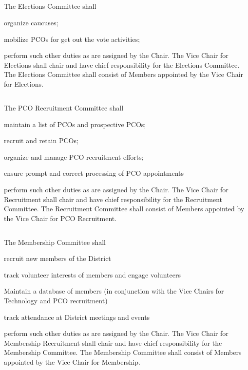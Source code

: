 \subsection{} \label{elections-committee}
The Elections Committee shall
\begin{inlinealphalist}
    \item organize caucuses;
    \item mobilize PCOs for get out the vote activities;
    \item perform such other duties as are assigned by the Chair. The Vice Chair for Elections shall chair and have chief responsibility for the Elections Committee. The Elections Committee shall consist of Members appointed by the Vice Chair for Elections.
\end{inlinealphalist}

\subsection{} \label{pco-recruitment-committee}
The PCO Recruitment Committee shall
\begin{inlinealphalist}
    \item maintain a list of PCOs and prospective PCOs;
    \item recruit and retain PCOs;
    \item organize and manage PCO recruitment efforts;
    \item ensure prompt and correct processing of PCO appointments
    \item perform such other duties as are assigned by the Chair. The Vice Chair for Recruitment shall chair and have chief responsibility for the Recruitment Committee.  The Recruitment Committee shall consist of Members appointed by the Vice Chair for PCO Recruitment.
\end{inlinealphalist}

\subsection{} \label{membership-committee}
The Membership Committee shall
\begin{inlinealphalist}
    \item recruit new members of the District
    \item track volunteer interests of members and engage volunteers
    \item Maintain a database of members (in conjunction with the Vice Chairs for Technology and PCO recruitment)
    \item track attendance at District meetings and events
    \item perform such other duties as are assigned by the Chair. The Vice Chair for Membership Recruitment shall chair and have chief responsibility for the Membership Committee. The Membership Committee shall consist of Members appointed by the Vice Chair for Membership.
\end{inlinealphalist}

